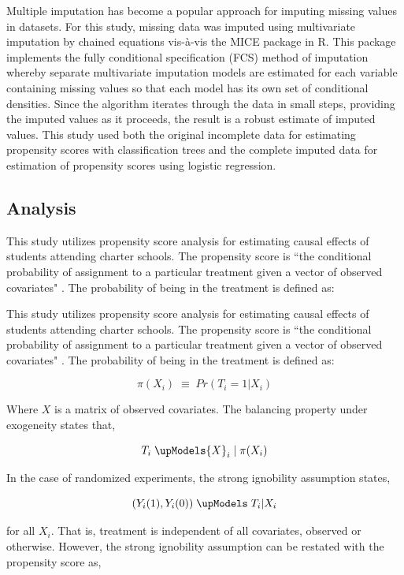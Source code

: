 \documentclass[letterpaper,12p,twoside]{article} %
\begin{document}
Multiple imputation \cite{rubin1987,Rubin1996mi} has become a popular approach for imputing missing values in datasets. For this study, missing data was imputed using multivariate imputation by chained equations vis-\`{a}-vis the MICE package \cite{mice,vanbuuren} in R. This package implements the fully conditional specification (FCS) method of imputation whereby separate multivariate imputation models are estimated for each variable containing missing values so that each model has its own set of conditional densities. Since the algorithm iterates through the data in small steps, providing the imputed values as it proceeds, the result is a robust estimate of imputed values. This study used both the original incomplete data for estimating propensity scores with classification trees and the complete imputed data for estimation of propensity scores using logistic regression.


\subsection{Analysis}

This study utilizes propensity score analysis for estimating causal effects of students attending charter schools. The propensity score is ``the conditional probability of assignment to a particular treatment given a vector of observed covariates" \cite{RosenbaumRubin1983}. The probability of being in the treatment is defined as:

This study utilizes propensity score analysis for estimating causal effects of students attending charter schools. The propensity score is ``the conditional probability of assignment to a particular treatment given a vector of observed covariates" \cite{RosenbaumRubin1983}. The probability of being in the treatment is defined as:

$$\pi ({ X }_{ i }) \; \equiv \; Pr({ T }_{ i } = 1 | { X }_{ i })$$

\noindent Where $X$ is a matrix of observed covariates. The balancing property under exogeneity states that,

$${ T }_{ i } \; \upModels { X }_{ i } \;| \; \pi ({ X }_{ i })$$

\noindent In the case of randomized experiments, the strong ignobility assumption states,

$$({ Y }_{ i }(1),{ Y }_{ i }(0)) \; \upModels \; { T }_{ i }|{ X }_{ i }$$

\noindent for all ${X}_{i}$. That is, treatment is independent of all covariates, observed or otherwise. However, the strong ignobility assumption can be restated with the propensity score as,
\end{document}
